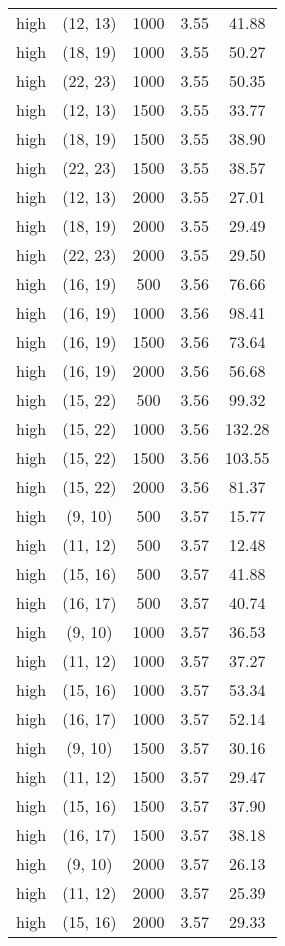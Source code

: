 \begin{tabular}{c c c c c}
high & (12, 13) &  1000 & 3.55 & 41.88 \\
high & (18, 19) &  1000 & 3.55 & 50.27 \\
high & (22, 23) &  1000 & 3.55 & 50.35 \\
high & (12, 13) &  1500 & 3.55 & 33.77 \\
high & (18, 19) &  1500 & 3.55 & 38.90 \\
high & (22, 23) &  1500 & 3.55 & 38.57 \\
high & (12, 13) &  2000 & 3.55 & 27.01 \\
high & (18, 19) &  2000 & 3.55 & 29.49 \\
high & (22, 23) &  2000 & 3.55 & 29.50 \\
high & (16, 19) &  500 & 3.56 & 76.66 \\
high & (16, 19) &  1000 & 3.56 & 98.41 \\
high & (16, 19) &  1500 & 3.56 & 73.64 \\
high & (16, 19) &  2000 & 3.56 & 56.68 \\
high & (15, 22) &  500 & 3.56 & 99.32 \\
high & (15, 22) &  1000 & 3.56 & 132.28 \\
high & (15, 22) &  1500 & 3.56 & 103.55 \\
high & (15, 22) &  2000 & 3.56 & 81.37 \\
high & (9, 10) &  500 & 3.57 & 15.77 \\
high & (11, 12) &  500 & 3.57 & 12.48 \\
high & (15, 16) &  500 & 3.57 & 41.88 \\
high & (16, 17) &  500 & 3.57 & 40.74 \\
high & (9, 10) &  1000 & 3.57 & 36.53 \\
high & (11, 12) &  1000 & 3.57 & 37.27 \\
high & (15, 16) &  1000 & 3.57 & 53.34 \\
high & (16, 17) &  1000 & 3.57 & 52.14 \\
high & (9, 10) &  1500 & 3.57 & 30.16 \\
high & (11, 12) &  1500 & 3.57 & 29.47 \\
high & (15, 16) &  1500 & 3.57 & 37.90 \\
high & (16, 17) &  1500 & 3.57 & 38.18 \\
high & (9, 10) &  2000 & 3.57 & 26.13 \\
high & (11, 12) &  2000 & 3.57 & 25.39 \\
high & (15, 16) &  2000 & 3.57 & 29.33 \\

\end{tabular}
